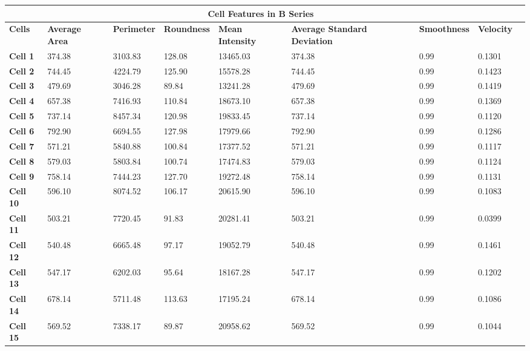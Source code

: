 \documentclass{article}
\begin{document}
\begin{table}[h!]
\centering
\begin{tabular}{ |p{1.7cm}|p{1.7cm}|p{1.7cm}|p{1.7cm}|p{1.7cm}|p{1.7cm}|p{1.7cm}|p{1.7cm}|p{1.7cm}| }
\hline
\multicolumn{8}{|c|}{\textbf{Cell Features in B Series}} \\
\hline
\textbf{Cells} & \textbf{Average Area} & \textbf{Perimeter} & \textbf{Roundness} & \textbf{Mean Intensity} & \textbf{Average Standard Deviation} & \textbf{Smoothness} & \textbf{Velocity} \\
\hline
\textbf{Cell 1} & 374.38 & 3103.83 & 128.08 & 13465.03 & 374.38 & 0.99 & 0.1301 \\
\textbf{Cell 2} & 744.45 & 4224.79 & 125.90 & 15578.28 & 744.45 & 0.99 & 0.1423 \\
\textbf{Cell 3} & 479.69 & 3046.28 & 89.84 & 13241.28 & 479.69 & 0.99 & 0.1419 \\
\textbf{Cell 4} & 657.38 & 7416.93 & 110.84 & 18673.10 & 657.38 & 0.99 & 0.1369 \\
\textbf{Cell 5} & 737.14 & 8457.34 & 120.98 & 19833.45 & 737.14 & 0.99 & 0.1120 \\
\textbf{Cell 6} & 792.90 & 6694.55 & 127.98 & 17979.66 & 792.90 & 0.99 & 0.1286 \\
\textbf{Cell 7} & 571.21 & 5840.88 & 100.84 & 17377.52 & 571.21 & 0.99 & 0.1117 \\
\textbf{Cell 8} & 579.03 & 5803.84 & 100.74 & 17474.83 & 579.03 & 0.99 & 0.1124 \\
\textbf{Cell 9} & 758.14 & 7444.23 & 127.70 & 19272.48 & 758.14 & 0.99 & 0.1131 \\
\textbf{Cell 10} & 596.10 & 8074.52 & 106.17 & 20615.90 & 596.10 & 0.99 & 0.1083 \\
\textbf{Cell 11} & 503.21 & 7720.45 & 91.83 & 20281.41 & 503.21 & 0.99 & 0.0399 \\
\textbf{Cell 12} & 540.48 & 6665.48 & 97.17 & 19052.79 & 540.48 & 0.99 & 0.1461 \\
\textbf{Cell 13} & 547.17 & 6202.03 & 95.64 & 18167.28 & 547.17 & 0.99 & 0.1202 \\
\textbf{Cell 14} & 678.14 & 5711.48 & 113.63 & 17195.24 & 678.14 & 0.99 & 0.1086 \\
\textbf{Cell 15} & 569.52 & 7338.17 & 89.87 & 20958.62 & 569.52 & 0.99 & 0.1044 \\
\hline
\end{tabular}
\end{table}
\end{document}
